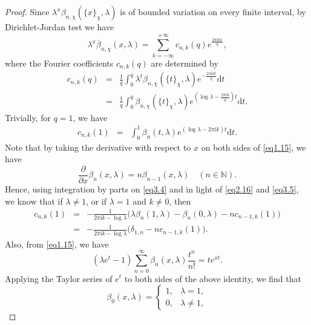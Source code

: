 \documentclass[reqno]{amsart}
\numberwithin{equation}{section}
\begin{document}
\begin{proof}
Since $\lambda^{x}\beta_{n,\chi}(\{x\}_{\chi},\lambda)$ is of bounded variation on every finite interval, by Dirichlet-Jordan test we have
\begin{equation}\label{eq3.2}
\lambda^{x}\overline{\beta}_{n,\chi}(x,\lambda)=\sum_{k=-\infty}^{+\infty}c_{n,k}(q)e^{\frac{2\pi\mathrm{i}kx}{q}},
\end{equation}
where the Fourier coefficients $c_{n,k}(q)$ are determined by
\begin{eqnarray}\label{eq3.3}
c_{n,k}(q)&=&\frac{1}{q}\int_{0}^{q}\lambda^{t}\beta_{n,\chi}(\{t\}_{\chi},\lambda)e^{-\frac{2\pi\mathrm{i}kt}{q}}\text{d}t\nonumber\\
&=&\frac{1}{q}\int_{0}^{q}\beta_{n,\chi}(\{t\}_{\chi},\lambda)e^{(\log\lambda-\frac{2\pi\mathrm{i}k}{q})t}\text{d}t.
\end{eqnarray}
Trivially, for $q=1$, we have
\begin{eqnarray}\label{eq3.4}
c_{n,k}(1)&=&\int_{0}^{1}\beta_{n}(t,\lambda)e^{(\log\lambda-2\pi\mathrm{i}k)t}\text{d}t.
\end{eqnarray}
Note that by taking the derivative with respect to $x$ on both sides of \eqref{eq1.15}, we have
\begin{equation}\label{eq3.5}
\frac{\partial}{\partial x}\beta_{n}(x,\lambda)=n\beta_{n-1}(x,\lambda)\quad(n\in\mathbb{N}).
\end{equation}
Hence, using integration by parts on \eqref{eq3.4} and in light of \eqref{eq2.16} and \eqref{eq3.5}, we know that if $\lambda\neq1$, or if $\lambda=1$ and $k\neq0$, then
\begin{eqnarray}\label{eq3.6}
c_{n,k}(1)&=&-\frac{1}{2\pi\mathrm{i}k-\log\lambda}\bigl(\lambda\beta_{n}(1,\lambda)-\beta_{n}(0,\lambda)-nc_{n-1,k}(1)\bigl)\nonumber\\
&=&-\frac{1}{2\pi\mathrm{i}k-\log\lambda}\bigl(\delta_{1,n}-nc_{n-1,k}(1)\bigl).
\end{eqnarray}
Also, from \eqref{eq1.15}, we have
\begin{equation*}
(\lambda e^{t}-1)\sum_{n=0}^{\infty}\beta_{n}(x,\lambda)\frac{t^{n}}{n!}=te^{xt}.
\end{equation*}
Applying the Taylor series of $e^{t}$ to both sides of the above identity, we find that
\begin{equation}\label{eq3.7}
\beta_{0}(x,\lambda)=\begin{cases}
1,  &\lambda=1,\\
0,  &\lambda\not=1,
\end{cases}

\end{equation}
\end{proof}
\end{document}
